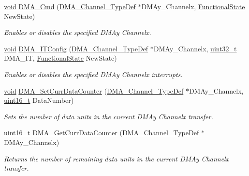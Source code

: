 \begin{DoxyCompactItemize}
\hyperlink{usb__devapi_8h_afabf60e7f57651d6d595a02c75f07cd0}{void} \hyperlink{group___d_m_a___private___functions_ga8e7cb6b9ae5f142e2961df879cdaba65}{D\+M\+A\+\_\+\+Cmd} (\hyperlink{struct_d_m_a___channel___type_def}{D\+M\+A\+\_\+\+Channel\+\_\+\+Type\+Def} $\ast$D\+M\+Ay\+\_\+\+Channelx, \hyperlink{agilefox_2library_2inc_2stm32f10x__type_8h_ac9a7e9a35d2513ec15c3b537aaa4fba1}{Functional\+State} New\+State)
\begin{DoxyCompactList}\small\item\em Enables or disables the specified D\+M\+Ay Channelx. \end{DoxyCompactList}\item 
\hyperlink{usb__devapi_8h_afabf60e7f57651d6d595a02c75f07cd0}{void} \hyperlink{group___d_m_a___private___functions_ga0bb60360be9cd57f96399be2f3b5eb2b}{D\+M\+A\+\_\+\+I\+T\+Config} (\hyperlink{struct_d_m_a___channel___type_def}{D\+M\+A\+\_\+\+Channel\+\_\+\+Type\+Def} $\ast$D\+M\+Ay\+\_\+\+Channelx, \hyperlink{_p_e___types_8h_a33594304e786b158f3fb30289278f5af}{uint32\+\_\+t} D\+M\+A\+\_\+\+IT, \hyperlink{agilefox_2library_2inc_2stm32f10x__type_8h_ac9a7e9a35d2513ec15c3b537aaa4fba1}{Functional\+State} New\+State)
\begin{DoxyCompactList}\small\item\em Enables or disables the specified D\+M\+Ay Channelx interrupts. \end{DoxyCompactList}\item 
\hyperlink{usb__devapi_8h_afabf60e7f57651d6d595a02c75f07cd0}{void} \hyperlink{group___d_m_a___private___functions_gade5d9e532814eaa46514cb385fdff709}{D\+M\+A\+\_\+\+Set\+Curr\+Data\+Counter} (\hyperlink{struct_d_m_a___channel___type_def}{D\+M\+A\+\_\+\+Channel\+\_\+\+Type\+Def} $\ast$D\+M\+Ay\+\_\+\+Channelx, \hyperlink{_p_e___types_8h_a1f1825b69244eb3ad2c7165ddc99c956}{uint16\+\_\+t} Data\+Number)
\begin{DoxyCompactList}\small\item\em Sets the number of data units in the current D\+M\+Ay Channelx transfer. \end{DoxyCompactList}\item 
\hyperlink{_p_e___types_8h_a1f1825b69244eb3ad2c7165ddc99c956}{uint16\+\_\+t} \hyperlink{group___d_m_a___private___functions_ga511b4c402d1ff32d53f28736956cac5d}{D\+M\+A\+\_\+\+Get\+Curr\+Data\+Counter} (\hyperlink{struct_d_m_a___channel___type_def}{D\+M\+A\+\_\+\+Channel\+\_\+\+Type\+Def} $\ast$D\+M\+Ay\+\_\+\+Channelx)
\begin{DoxyCompactList}\small\item\em Returns the number of remaining data units in the current D\+M\+Ay Channelx transfer. \end{DoxyCompactList}\item 

\end{DoxyCompactItemize}
